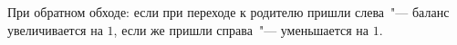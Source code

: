 \begin{frame}
    При обратном обходе: если при переходе к родителю пришли слева "--- баланс увеличивается на $1$,
    если же пришли справа "--- уменьшается на $1$.
\end{frame}